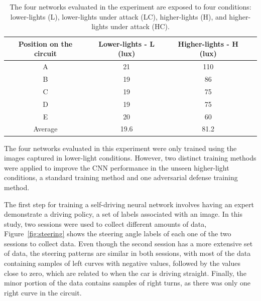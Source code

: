 \documentclass[12pt]{article}
\begin{document}
\begin{table}[H]
\begin{center}
\begin{tabular}{ |c|c|c|c| } 
\hline
Position on the circuit & Lower-lights - L (lux) & Higher-lights - H (lux) \\
\hline
A & 21 & 110  \\ 
B & 19 & 86 \\ 
C & 19 & 75 \\ 
D & 19 & 75 \\ 
E & 20 & 60 \\ 
\hline
Average & 19.6 & 81.2\\
\hline
\end{tabular}
\caption{\label{tab:lightlevels}The four networks evaluated in the experiment are exposed to four conditions: lower-lights (L), lower-lights under attack (LC), higher-lights (H), and higher-lights under attack (HC).}
\end{center}
\end{table}

The four networks evaluated in this experiment were only trained using the images captured in lower-light conditions. However, two distinct training methods were applied to improve the CNN performance in the unseen higher-light conditions, a standard training method and one adversarial defense training method. 

The first step for training a self-driving neural network involves having an expert demonstrate a driving policy, a set of labels associated with an image. In this study, two sessions were used to collect different amounts of data, Figure~\ref{fig:steering} shows the steering angle labels of each one of the two sessions to collect data. Even though the second session has a more extensive set of data, the steering patterns are similar in both sessions, with most of the data containing samples of left curves with negative values, followed by the values close to zero, which are related to when the car is driving straight. Finally, the minor portion of the data contains samples of right turns, as there was only one right curve in the circuit.
\end{document}
